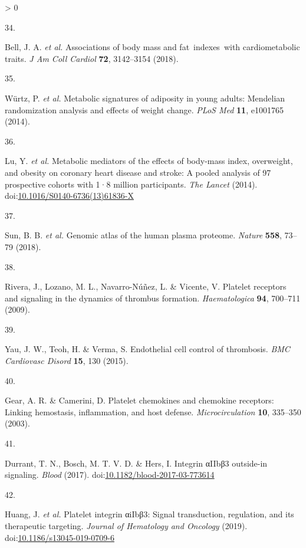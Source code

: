 \documentclass[11pt,twoside]{bristolthesis}
\newlength{\cslhangindent}
\newlength{\csllabelwidth}
\newenvironment{CSLReferences}[2] %
 {%
  \setlength{\parindent}{0pt}
  \ifodd #1 \everypar{\setlength{\hangindent}{\cslhangindent}}\ignorespaces\fi
  \ifnum #2 > 0
  \setlength{\parskip}{#2\baselineskip}
  \fi
 }%
 {}
\newcommand{\CSLLeftMargin}[1]{\parbox[t]{\csllabelwidth}{#1}}
\newcommand{\CSLRightInline}[1]{\parbox[t]{\linewidth - \csllabelwidth}{#1}\break}
\begin{document}
\begin{CSLReferences}{0}{0}
\leavevmode\hypertarget{ref-Bell2018a}{}%
\CSLLeftMargin{34. }
\CSLRightInline{Bell, J. A. \emph{et al.} Associations of body mass and fat~indexes~with cardiometabolic traits. \emph{J Am Coll Cardiol} \textbf{72}, 3142--3154 (2018).}

\leavevmode\hypertarget{ref-Wurtz2014}{}%
\CSLLeftMargin{35. }
\CSLRightInline{Würtz, P. \emph{et al.} Metabolic signatures of adiposity in young adults: Mendelian randomization analysis and effects of weight change. \emph{PLoS Med} \textbf{11}, e1001765 (2014).}

\leavevmode\hypertarget{ref-Lu2014}{}%
\CSLLeftMargin{36. }
\CSLRightInline{Lu, Y. \emph{et al.} Metabolic mediators of the effects of body-mass index, overweight, and obesity on coronary heart disease and stroke: A pooled analysis of 97 prospective cohorts with 1·8 million participants. \emph{The Lancet} (2014). doi:\href{https://doi.org/10.1016/S0140-6736(13)61836-X}{10.1016/S0140-6736(13)61836-X}}

\leavevmode\hypertarget{ref-Sun2018}{}%
\CSLLeftMargin{37. }
\CSLRightInline{Sun, B. B. \emph{et al.} Genomic atlas of the human plasma proteome. \emph{Nature} \textbf{558}, 73--79 (2018).}

\leavevmode\hypertarget{ref-Rivera2009}{}%
\CSLLeftMargin{38. }
\CSLRightInline{Rivera, J., Lozano, M. L., Navarro-Núñez, L. \& Vicente, V. Platelet receptors and signaling in the dynamics of thrombus formation. \emph{Haematologica} \textbf{94}, 700--711 (2009).}

\leavevmode\hypertarget{ref-Yau2015}{}%
\CSLLeftMargin{39. }
\CSLRightInline{Yau, J. W., Teoh, H. \& Verma, S. Endothelial cell control of thrombosis. \emph{BMC Cardiovasc Disord} \textbf{15}, 130 (2015).}

\leavevmode\hypertarget{ref-Gear2003}{}%
\CSLLeftMargin{40. }
\CSLRightInline{Gear, A. R. \& Camerini, D. Platelet chemokines and chemokine receptors: Linking hemostasis, inflammation, and host defense. \emph{Microcirculation} \textbf{10}, 335--350 (2003).}

\leavevmode\hypertarget{ref-Durrant2017a}{}%
\CSLLeftMargin{41. }
\CSLRightInline{Durrant, T. N., Bosch, M. T. V. D. \& Hers, I. Integrin αIIbβ3 outside-in signaling. \emph{Blood} (2017). doi:\href{https://doi.org/10.1182/blood-2017-03-773614}{10.1182/blood-2017-03-773614}}

\leavevmode\hypertarget{ref-Huang2019}{}%
\CSLLeftMargin{42. }
\CSLRightInline{Huang, J. \emph{et al.} Platelet integrin αiIbβ3: Signal transduction, regulation, and its therapeutic targeting. \emph{Journal of Hematology and Oncology} (2019). doi:\href{https://doi.org/10.1186/s13045-019-0709-6}{10.1186/s13045-019-0709-6}}


\end{CSLReferences}
\end{document}
